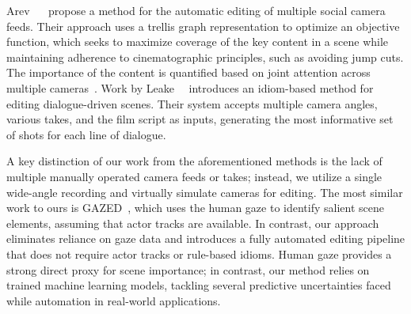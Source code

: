Arev ~\etal~\cite{arev2014automatic} propose a method for the automatic editing of multiple social camera feeds. Their approach uses a trellis graph representation to optimize an objective function, which seeks to maximize coverage of the key content in a scene while maintaining adherence to cinematographic principles, such as avoiding jump cuts. The importance of the content is quantified based on joint attention across multiple cameras~\cite{NIPS2012_1bf2efbb}. Work by Leake~\etal~\cite{leake-speaker} introduces an idiom-based method for editing dialogue-driven scenes. Their system accepts multiple camera angles, various takes, and the film script as inputs, generating the most informative set of shots for each line of dialogue. 

A key distinction of our work from the aforementioned methods is the lack of multiple manually operated camera feeds or takes; instead, we utilize a single wide-angle recording and virtually simulate cameras for editing. 
The most similar work to ours is GAZED~\cite{gazed}, which uses the human gaze to identify salient scene elements, assuming that actor tracks are available. In contrast, our approach eliminates reliance on gaze data and introduces a fully automated editing pipeline that does not require actor tracks or rule-based idioms. Human gaze provides a strong direct proxy for scene importance; in contrast, our method relies on trained machine learning models, tackling several predictive uncertainties faced while automation in real-world applications.